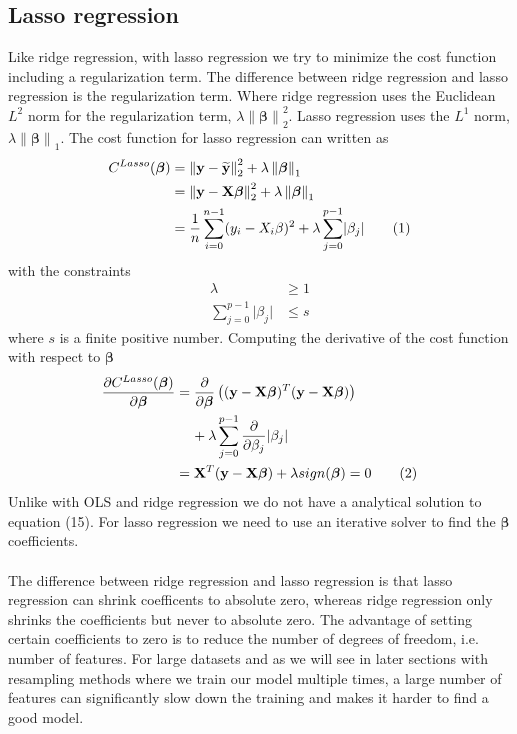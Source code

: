 \documentclass[a4paper,twocolumn]{article}
\newcommand\numberthis{\addtocounter{equation}{1}\tag{\theequation}}
\newcommand{\y}{\mathbf{y}}
\newcommand{\ytilde}{\mathbf{\widetilde{y}}}
\newcommand{\X}{\mathbf{X}}
\newcommand{\B}{\boldsymbol{\beta}}
\newcommand{\norm}[1]{\left\lVert#1\right\rVert}
\begin{document}
\subsection{Lasso regression}
Like ridge regression, with lasso regression we try to minimize the cost function including a regularization term. The difference between ridge regression and lasso regression is the regularization term. Where ridge regression uses the Euclidean $L^{2}$ norm for the regularization term, $\lambda\norm{\B}_{2}^{2}$. Lasso regression uses the $L^{1}$ norm, $\lambda\norm{\B}_{1}$. The cost function for lasso regression can written as
\begin{align*}
    C^{Lasso}(\B) &= \norm{\y - \ytilde}_{2}^{2} + \lambda\norm{\B}_{1}\\
    &= \norm{\y - \X\B}_{2}^{2} + \lambda\norm{\B}_{1}\\
    &= \frac{1}{n}\sum_{i=0}^{n-1}(y_{i} - X_{i}\beta )^{2} + \lambda\sum_{j=0}^{p-1}\lvert\beta_{j}\rvert\numberthis\label{eqn}
\end{align*}
with the constraints
\begin{align*}
    \lambda &\geq 1\\
    \sum_{j=0}^{p-1}\lvert\beta_{j}\rvert &\leq s
\end{align*}
where $s$ is a finite positive number. Computing the derivative of the cost function with respect to $\B$
\begin{align*}
    \frac{\partial C^{Lasso}(\B)}{\partial \B} &= \frac{\partial}{\partial \B}\left((\y - \X\B)^{T}(\y - \X\B)\right) \\&
    \hspace{0.4cm}+ \lambda\sum_{j=0}^{p-1}\frac{\partial}{\partial \beta_{j}}\lvert\beta_{j}\rvert\\
    &= \X^{T}(\y - \X\B) + \lambda sign(\B) = 0\numberthis\label{eqn}
\end{align*}
Unlike with OLS and ridge regression we do not have a analytical solution to equation (15). For lasso regression we need to use an iterative solver to find the $\B$ coefficients. \\
\\
The difference between ridge regression and lasso regression is that lasso regression can shrink coefficents to absolute zero, whereas ridge regression only shrinks the coefficients but never to absolute zero. The advantage of setting certain coefficients to zero is to reduce the number of degrees of freedom, i.e. number of features\cite{ridge1, ridge2}. For large datasets and as we will see in later sections with resampling methods where we train our model multiple times, a large number of features can significantly slow down the training and makes it harder to find a good model.
\end{document}
